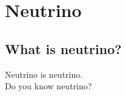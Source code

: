
%
%

\section{Neutrino}\label{Section_001}

\subsection{What is neutrino?}
\vs\hs Neutrino is neutrino.\\
Do you know neutrino?

\newpage
